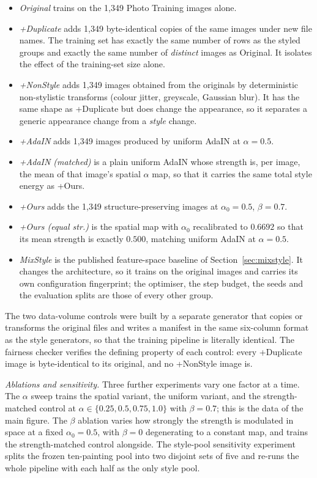 \begin{itemize}
\item \textit{Original} trains on the 1{,}349 Photo Training images alone.
\item \textit{+Duplicate} adds 1{,}349 byte-identical copies of the same images under new file names. The training set has exactly the same number of rows as the styled groups and exactly the same number of \emph{distinct} images as Original. It isolates the effect of the training-set size alone.
\item \textit{+NonStyle} adds 1{,}349 images obtained from the originals by deterministic non-stylistic transforms (colour jitter, greyscale, Gaussian blur). It has the same shape as +Duplicate but does change the appearance, so it separates a generic appearance change from a \emph{style} change.
\item \textit{+AdaIN} adds 1{,}349 images produced by uniform AdaIN at $\alpha = 0.5$.
\item \textit{+AdaIN (matched)} is a plain uniform AdaIN whose strength is, per image, the mean of that image's spatial $\alpha$ map, so that it carries the same total style energy as +Ours.
\item \textit{+Ours} adds the 1{,}349 structure-preserving images at $\alpha_0 = 0.5$, $\beta = 0.7$.
\item \textit{+Ours (equal str.)} is the spatial map with $\alpha_0$ recalibrated to $0.6692$ so that its mean strength is exactly $0.500$, matching uniform AdaIN at $\alpha = 0.5$.
\item \textit{MixStyle} is the published feature-space baseline of Section~\ref{sec:mixstyle}. It changes the architecture, so it trains on the original images and carries its own configuration fingerprint; the optimiser, the step budget, the seeds and the evaluation splits are those of every other group.
\end{itemize}

The two data-volume controls were built by a separate generator that copies or transforms the original files and writes a manifest in the same six-column format as the style generators, so that the training pipeline is literally identical. The fairness checker verifies the defining property of each control: every +Duplicate image is byte-identical to its original, and no +NonStyle image is.

\textit{Ablations and sensitivity.} Three further experiments vary one factor at a time. The $\alpha$ sweep trains the spatial variant, the uniform variant, and the strength-matched control at $\alpha \in \{0.25, 0.5, 0.75, 1.0\}$ with $\beta = 0.7$; this is the data of the main figure. The $\beta$ ablation varies how strongly the strength is modulated in space at a fixed $\alpha_0 = 0.5$, with $\beta = 0$ degenerating to a constant map, and trains the strength-matched control alongside. The style-pool sensitivity experiment splits the frozen ten-painting pool into two disjoint sets of five and re-runs the whole pipeline with each half as the only style pool.

